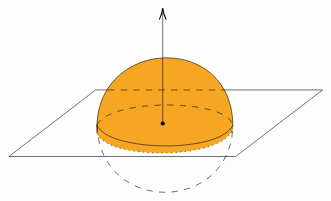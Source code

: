 \documentclass{article}
\begin{document}
\begin{example}
\[\begin{tikzpicture}[x=0.75pt,y=0.75pt,yscale=-1,xscale=1]
            \draw  [draw opacity=0][fill={rgb, 255:red, 245; green, 166; blue, 35 }  ,fill opacity=1 ] (158,134.13) -- (286.87,134.13) -- (286.87,143.93) -- (158,143.93) -- cycle ;
            \draw  [dash pattern={on 4.5pt off 4.5pt}]  (158,135.93) .. controls (160.87,222.51) and (286.87,220.51) .. (287.87,135.93) ;
            \draw    (73.87,166) -- (156.83,102.51) ;
            \draw    (73.87,166) -- (290.58,166) ;
            \draw    (290.58,166) -- (373.53,102.51) ;
            \draw [fill={rgb, 255:red, 245; green, 166; blue, 35 }  ,fill opacity=1 ]   (158,135.93) .. controls (160.87,52.51) and (286.87,48.51) .. (287.87,135.93) ;
            \draw  [dash pattern={on 4.5pt off 4.5pt}]  (158,135.93) .. controls (169.87,110.51) and (281.87,110.51) .. (287.87,135.93) ;
            \draw  [line width=3] [line join = round][line cap = round] (220.87,134.51) .. controls (220.87,134.51) and (220.87,134.51) .. (220.87,134.51) ;
            \draw    (220.87,134.51) -- (220.87,26.51) ;
            \draw [shift={(220.87,24.51)}, rotate = 90] [color={rgb, 255:red, 0; green, 0; blue, 0 }  ][line width=0.75]    (10.93,-3.29) .. controls (6.95,-1.4) and (3.31,-0.3) .. (0,0) .. controls (3.31,0.3) and (6.95,1.4) .. (10.93,3.29)   ;
            \draw    (156.83,102.51) -- (168.87,102.51) ;
            \draw    (373.53,102.51) -- (278.87,102.51) ;
            \draw  [dash pattern={on 4.5pt off 4.5pt}]  (168.87,102.51) -- (278.87,102.51) ;
            \draw    (158,135.93) -- (158,143.93) ;
            \draw    (287.87,135.93) -- (286.87,141.51) ;
            \draw [fill={rgb, 255:red, 245; green, 166; blue, 35 }  ,fill opacity=1 ] [dash pattern={on 0.84pt off 2.51pt}]  (158,143.93) .. controls (167.87,169.51) and (274.87,169.08) .. (286.87,141.51) ;
            \draw    (158,135.93) .. controls (167.87,161.51) and (275.87,163.51) .. (287.87,135.93) ;
            

\end{tikzpicture}\]
\end{example}
\end{document}
